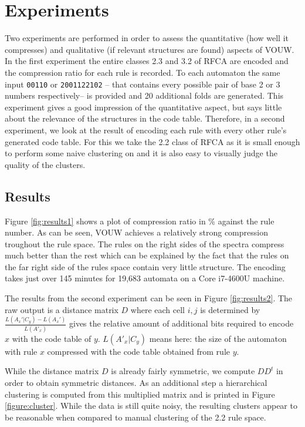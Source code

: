 \documentclass{llncs}
\begin{document}
\section{Experiments}

Two experiments are performed in order to assess the quantitative (how well it compresses) and qualitative (if relevant structures are found) aspects of VOUW. In the first experiment the entire classes 2.3 and 3.2 of RFCA are encoded and the compression ratio for each rule is recorded. To each automaton the same input \texttt{00110} or \texttt{2001122102} -- that contains every possible pair of base 2 or 3 numbers respectively-- is provided and 20 additional folds are generated. This experiment gives a good impression of the quantitative aspect, but says little about the relevance of the structures in the code table. Therefore, in a second experiment, we look at the result of encoding each rule with every other rule's generated code table. For this we take the 2.2 class of RFCA as it is small enough to perform some naive clustering on and it is also easy to visually judge the quality of the clusters.

\subsection{Results}

Figure \ref{fig:results1} shows a plot of compression ratio in \% against the rule number. As can be seen, VOUW achieves a relatively strong compression troughout the rule space. The rules on the right sides of the spectra compress much better than the rest which can be explained by the fact that the rules on the far right side of the rules space contain very little structure. The encoding takes just over 145 minutes for 19,683 automata on a Core i7-4600U machine.

The results from the second experiment can be seen in Figure \ref{fig:results2}. The raw output is a distance matrix $D$ where each cell $i,j$ is determined by $\frac{L(A_x'|C_y)-L(A_x')}{L(A'_x)}$ gives the relative amount of additional bits required to encode $x$ with the code table of $y$. $L(A'_x|C_y)$ means here: the size of the automaton with rule $x$ compressed with the code table obtained from rule $y$.

While the distance matrix $D$ is already fairly symmetric, we compute $DD^t$ in order to obtain symmetric distances. As an additional step a hierarchical clustering is computed from this multiplied matrix and is printed in Figure \ref{figure:cluster}. While the data is still quite noisy, the resulting clusters appear to be reasonable when compared to manual clustering of the 2.2 rule space. 
\end{document}

